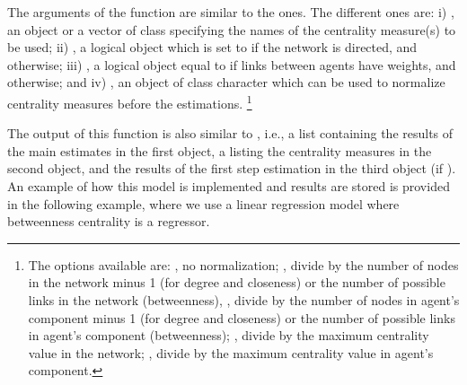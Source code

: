 \documentclass[nojss]{jss}
\begin{document}
The arguments of the function  are similar to the  ones. The different ones are: i) , an object or a vector of class  specifying the names of the centrality measure(s) to be used; ii) , a logical object
which is set to  if the network is directed, and  otherwise; iii) , a logical object equal to  if links between agents have weights, and  otherwise; and iv) , an object
of class character which can be used to normalize centrality measures before the estimations. \footnote{The options available are: , no normalization; , divide by the number of nodes in the network minus 1 (for degree and closeness) or the number of possible links in the network (betweenness), , divide by the number of nodes in agent's component minus 1 (for degree and closeness) or the number of possible links in agent's component (betweenness); , divide by the maximum centrality value in the network; , divide by the maximum centrality value in agent's component.}

The output of this function is also similar to , i.e., a list containing the results of the main estimates in the first object, a  listing the centrality measures in the second object, and the results of the first step estimation in the third object (if ). An example of how this model is implemented and results are stored is provided in the following example, where we use a linear regression model where betweenness centrality is a regressor.
\end{document}
